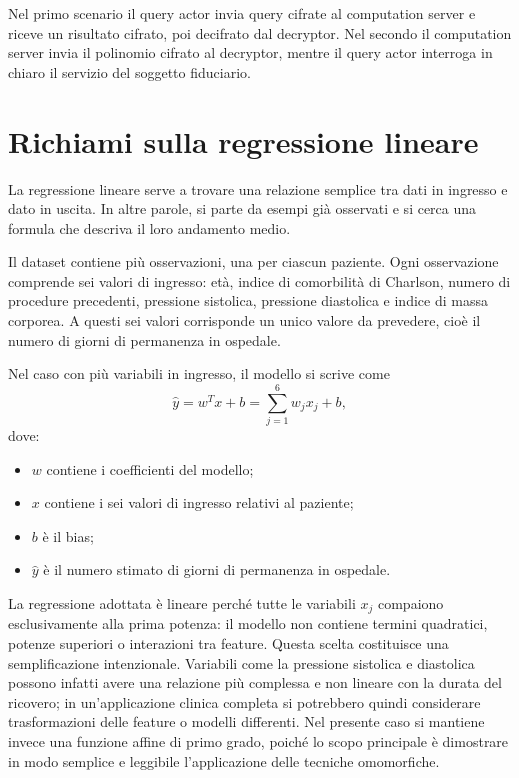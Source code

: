 Nel primo scenario il query actor invia query cifrate al computation server e riceve un risultato cifrato, poi decifrato dal decryptor. Nel secondo il computation server invia il polinomio cifrato al decryptor, mentre il query actor interroga in chiaro il servizio del soggetto fiduciario.

\section{Richiami sulla regressione lineare}
La regressione lineare serve a trovare una relazione semplice tra dati in ingresso e dato in uscita. In altre parole, si parte da esempi gi\`a osservati e si cerca una formula che descriva il loro andamento medio.

Il dataset contiene pi\`u osservazioni, una per ciascun paziente. Ogni osservazione comprende sei valori di ingresso: et\`a, indice di comorbilit\`a di Charlson, numero di procedure precedenti, pressione sistolica, pressione diastolica e indice di massa corporea. A questi sei valori corrisponde un unico valore da prevedere, cio\`e il numero di giorni di permanenza in ospedale.

Nel caso con pi\`u variabili in ingresso, il modello si scrive come
\begin{equation}
\hat{y} = w^T x + b = \sum_{j=1}^{6} w_j x_j + b,
\end{equation}
dove:
\begin{itemize}
  \item $w$ contiene i coefficienti del modello;
  \item $x$ contiene i sei valori di ingresso relativi al paziente;
  \item $b$ \`e il bias;
  \item $\hat{y}$ \`e il numero stimato di giorni di permanenza in ospedale.
\end{itemize}

La regressione adottata \`e lineare perch\'e tutte le variabili $x_j$ compaiono esclusivamente alla prima potenza: il modello non contiene termini quadratici, potenze superiori o interazioni tra feature. Questa scelta costituisce una semplificazione intenzionale. Variabili come la pressione sistolica e diastolica possono infatti avere una relazione pi\`u complessa e non lineare con la durata del ricovero; in un'applicazione clinica completa si potrebbero quindi considerare trasformazioni delle feature o modelli differenti. Nel presente caso si mantiene invece una funzione affine di primo grado, poich\'e lo scopo principale \`e dimostrare in modo semplice e leggibile l'applicazione delle tecniche omomorfiche.

